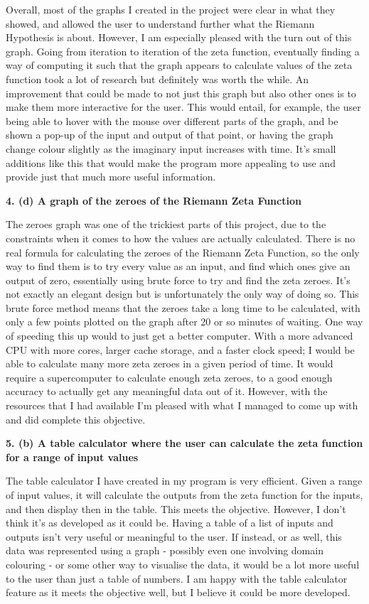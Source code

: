 \documentclass{article}
\begin{document}
Overall, most of the graphs I created in the project were clear in what they showed, and allowed the user to understand further what the Riemann Hypothesis is about. However, I am especially pleased with the turn out of this graph. Going from iteration to iteration of the zeta function, eventually finding a way of computing it such that the graph appears to calculate values of the zeta function took a lot of research but definitely was worth the while. An improvement that could be made to not just this graph but also other ones is to make them more interactive for the user. This would entail, for example, the user being able to hover with the mouse over different parts of the graph, and be shown a pop-up of the input and output of that point, or having the graph change colour slightly as the imaginary input increases with time. It's small additions like this that would make the program more appealing to use and provide just that much more useful information.

\textbf{4. (d) A graph of the zeroes of the Riemann Zeta Function}

The zeroes graph was one of the trickiest parts of this project, due to the constraints when it comes to how the values are actually calculated. There is no real formula for calculating the zeroes of the Riemann Zeta Function, so the only way to find them is to try every value as an input, and find which ones give an output of zero, essentially using brute force to try and find the zeta zeroes. It's not exactly an elegant design but is unfortunately the only way of doing so. This brute force method means that the zeroes take a long time to be calculated, with only a few points plotted on the graph after 20 or so minutes of waiting. One way of speeding this up would to just get a better computer. With a more advanced CPU with more cores, larger cache storage, and a faster clock speed; I would be able to calculate many more zeta zeroes in a given period of time. It would require a supercomputer to calculate enough zeta zeroes, to a good enough accuracy to actually get any meaningful data out of it. However, with the resources that I had available I'm pleased with what I managed to come up with and did complete this objective.

\textbf{5. (b) A table calculator where the user can calculate the zeta function for a range of input values}

The table calculator I have created in my program is very efficient. Given a range of input values, it will calculate the outputs from the zeta function for the inputs, and then display then in the table. This meets the objective. However, I don't think it's as developed as it could be. Having a table of a list of inputs and outputs isn't very useful or meaningful to the user. If instead, or as well, this data was represented using a graph - possibly even one involving domain colouring - or some other way to visualise the data, it would be a lot more useful to the user than just a table of numbers. I am happy with the table calculator feature as it meets the objective well, but I believe it could be more developed.
\end{document}
